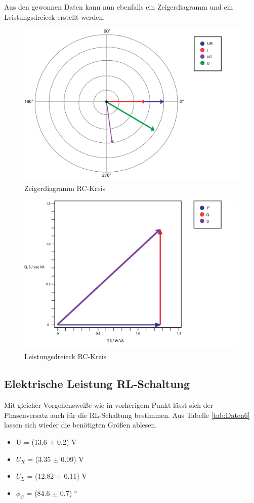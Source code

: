 \documentclass[12pt,a4paper,twoside]{article}
\begin{document}
\noindent
Aus den gewonnen Daten kann nun ebenfalls ein Zeigerdiagramm und ein Leistungsdreieck erstellt werden.

\begin{figure}[H]
    \centering
    \includegraphics[width=0.6\linewidth]{nudes/Phasendiagramm5.png}
    \caption{Zeigerdiagramm RC-Kreis}
    \label{fig:ZeigerdiagrammRC}
\end{figure}

\begin{figure}[H]
    \centering
    \includegraphics[width=0.6\linewidth]{nudes/Leistungsdreieck5.png}
    \caption{Leistungsdreieck RC-Kreis}
    \label{fig:LeistungsdreieckRC}
\end{figure}


\subsection{Elektrische Leistung RL-Schaltung}

Mit gleicher Vorgehensweiße wie in vorherigem Punkt lässt sich der Phasenversatz auch für die RL-Schaltung bestimmen. Aus Tabelle \ref{tab:Daten6} lassen sich wieder die benötigten Größen ablesen.

\begin{itemize}
    \item U = (13.6 $\pm$ 0.2) V
    \item $U_R$ = (3.35 $\pm$ 0.09) V
    \item $U_L$ = (12.82 $\pm$ 0.11) V
    \item $\phi_C$ = (84.6 $\pm$ 0.7) °
\end{itemize}
\end{document}
